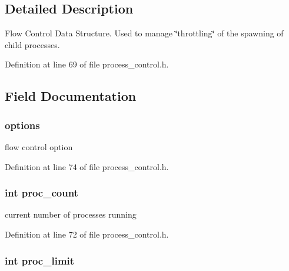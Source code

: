 \subsection{Detailed Description}
Flow Control Data Structure. Used to manage \char`\"{}throttling\char`\"{} of the spawning of child processes. 

Definition at line 69 of file process\-\_\-control.\-h.



\subsection{Field Documentation}
\hypertarget{struct_f_c_d_s_a5cdd77672689f5e901ee2bd260503883}{
\subsubsection[{options}]{ options}}\label{struct_f_c_d_s_a5cdd77672689f5e901ee2bd260503883}


flow control option 



Definition at line 74 of file process\-\_\-control.\-h.

\hypertarget{struct_f_c_d_s_a3993a5b3c3319ca8c07b29e2bf0273ce}{
\subsubsection[{proc\-\_\-count}]{\setlength{\rightskip}{0pt plus 5cm}int proc\-\_\-count}}\label{struct_f_c_d_s_a3993a5b3c3319ca8c07b29e2bf0273ce}


current number of processes running 



Definition at line 72 of file process\-\_\-control.\-h.

\hypertarget{struct_f_c_d_s_a70c503d9173a43accc52ad4fa5bafb5e}{
\subsubsection[{proc\-\_\-limit}]{\setlength{\rightskip}{0pt plus 5cm}int proc\-\_\-limit}}\label{struct_f_c_d_s_a70c503d9173a43accc52ad4fa5bafb5e}


